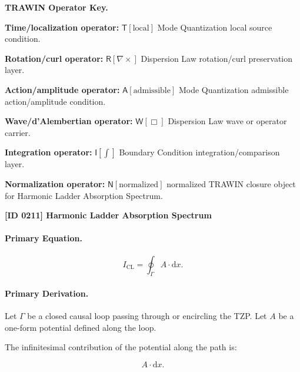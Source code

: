\par\vspace{0.45\baselineskip}
\noindent\begin{minipage}[t]{\linewidth}
\begingroup
\small
\raggedright
\textbf{TRAWIN Operator Key.}\par
\noindent\textbf{Time/localization operator:} $\mathsf{T}\!\left[\mathrm{local}\right]$ Mode Quantization local source condition.\par
\noindent\textbf{Rotation/curl operator:} $\mathsf{R}\!\left[\nabla\times\right]$ Dispersion Law rotation/curl preservation layer.\par
\noindent\textbf{Action/amplitude operator:} $\mathsf{A}\!\left[\mathrm{admissible}\right]$ Mode Quantization admissible action/amplitude condition.\par
\noindent\textbf{Wave/d'Alembertian operator:} $\mathsf{W}\!\left[\Box\right]$ Dispersion Law wave or operator carrier.\par
\noindent\textbf{Integration operator:} $\mathsf{I}\!\left[\int\right]$ Boundary Condition integration/comparison layer.\par
\noindent\textbf{Normalization operator:} $\mathsf{N}\!\left[\mathrm{normalized}\right]$ normalized TRAWIN closure object for Harmonic Ladder Absorption Spectrum.\par
\endgroup
\end{minipage}

\clearpage
\noindent\textbf{[ID 0211] Harmonic Ladder Absorption Spectrum}\par
\vspace{0.35em}
\paragraph{Primary Equation.}
\begin{equation}
I_{\mathrm{CL}}
=
\oint_{\Gamma} A\cdot \mathrm{d}x .
\end{equation}

\paragraph{Primary Derivation.}
Let $\Gamma$ be a closed causal loop passing through or encircling the TZP.  
Let $A$ be a one-form potential defined along the loop.

The infinitesimal contribution of the potential along the path is:

\begin{equation}
A\cdot \mathrm{d}x .
\end{equation}

